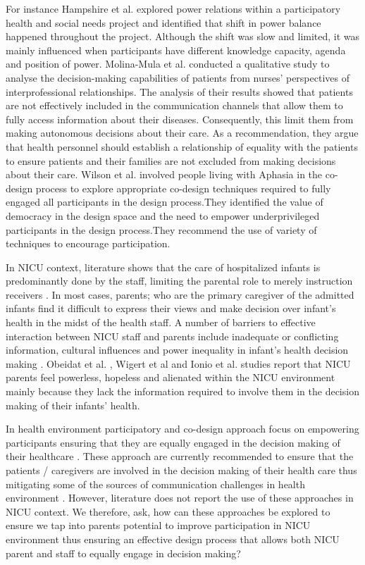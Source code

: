 For instance Hampshire et al. \citep{Hampshire2015} explored power relations within a participatory health and social needs project and identified that shift in power balance  happened throughout the project. Although the shift was slow and limited, it was mainly influenced when participants have different knowledge capacity, agenda and position of power. Molina-Mula  et al. \citep{Molina2018} conducted a qualitative study to analyse the decision-making capabilities of patients from nurses’ perspectives of interprofessional relationships. The analysis of their results showed that patients are not effectively included in the communication channels that allow them to fully access information about their diseases. Consequently, this limit them from making autonomous decisions about their care. As a recommendation, they argue that health personnel should establish a relationship of equality with the patients to ensure patients and their families are not excluded from making decisions about their care. Wilson et al. \citep{Wilson2015} involved people living with Aphasia in the co-design process to explore appropriate co-design techniques required to fully engaged all participants in the design process.They identified the value of democracy in the design space and the need to empower underprivileged participants in the design process.They recommend the use of variety of techniques to encourage participation.

In NICU context, literature shows that the care of hospitalized infants is predominantly done by the staff, limiting the parental role to merely instruction receivers \citep{Jones2007a,Obeidat2009, Heidari2015a}. In most cases, parents; who are the primary caregiver of the admitted infants find it difficult to  express their views and make decision over infant's health in the midst of the health staff. A number of barriers to effective interaction between NICU staff and parents include inadequate or conflicting information, cultural influences and power inequality in infant's health decision making \citep{Jones2007a, VanMcCrary2014}. Obeidat et al. \citep{Obeidat2009}, Wigert et al \citep{Wigert2014b} and Ionio et al. \citep{Ionio2016} studies report that NICU parents feel powerless, hopeless and alienated within the NICU environment mainly because they lack the information required to involve them in the decision making of their infants' health.

In health environment participatory and co-design approach focus on empowering participants ensuring that they are equally engaged in the decision making of their healthcare \citep{Piper2018}. These approach are currently recommended to ensure that the patients / caregivers are involved in the decision making of their health care thus mitigating some of the sources of communication challenges in health environment \citep{Blandford2018,Dietrich2017, Birnbaum2016}. However, literature does not report the use of these approaches in NICU context. We therefore, ask, how can these approaches be explored to ensure we tap into parents potential to improve participation in NICU environment thus ensuring an effective design process that allows both NICU parent and staff to equally engage in decision making?

